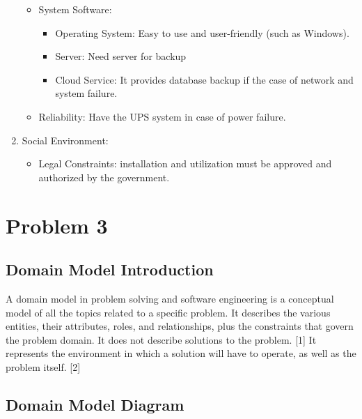 \documentclass[11pt,oneside]{book}
\begin{document}
\begin{enumerate}
\begin{itemize}
\begin{itemize}
 \end{itemize} 
 \item System Software:
 \begin{itemize}
 
\item Operating System: Easy to use and user-friendly (such as Windows).
\item Server: Need server for backup
\item Cloud Service: It provides database backup if the case of network and system failure.

 \end{itemize} 

\item Reliability: Have the UPS system in case of power failure.

        \end{itemize}


\item Social Environment:
\begin{itemize}
\item	Legal Constraints: installation and utilization must be approved and authorized by the government.

\end{itemize}       
  
\end{enumerate}



\chapter{Problem 3}

\section{Domain Model Introduction}
A domain model in problem solving and software engineering is a conceptual model of all the topics related to a specific problem. It describes the various entities, their attributes, roles, and relationships, plus the constraints that govern the problem domain. It does not describe solutions to the problem. [1] It represents the environment in which a solution will have to operate, as well as the problem itself. [2]

\section{Domain Model Diagram}
\end{document}
